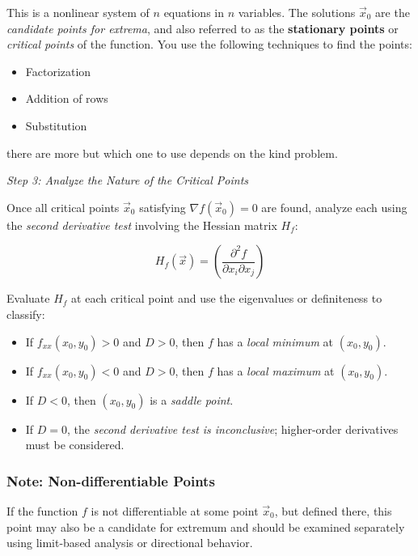 This is a nonlinear system of \( n \) equations in \( n \) variables. The solutions \( \vec{x}_0 \) 
are the \emph{candidate points for extrema}, and also referred to as the 
\textbf{stationary points} or \emph{critical points} of the function.
\newline
You use the following techniques to find the points: 
\begin{itemize}[label=\(-\)]
    \item Factorization
    \item Addition of rows
    \item Substitution
\end{itemize}

there are more but which one to use depends on the kind problem.

\emph{Step 3: Analyze the Nature of the Critical Points}

Once all critical points \( \vec{x}_0 \) satisfying \( \nabla f(\vec{x}_0) = 0 \) are found, analyze each using
 the \emph{second derivative test} involving the Hessian matrix \( H_f \):

\[
H_f(\vec{x}) = \left( \frac{\partial^2 f}{\partial x_i \partial x_j} \right)
\]

Evaluate \( H_f \) at each critical point and use the eigenvalues or definiteness to classify:

\begin{itemize}[label=\(-\)]
    \item If \( f_{xx}(x_0, y_0) > 0 \) and \( D > 0 \), then \( f \) has a \emph{local minimum} at \( (x_0, y_0) \).
    \item If \( f_{xx}(x_0, y_0) < 0 \) and \( D > 0 \), then \( f \) has a \emph{local maximum} at \( (x_0, y_0) \).
    \item If \( D < 0 \), then \( (x_0, y_0) \) is a \emph{saddle point}.
    \item If \( D = 0 \), the \emph{second derivative test is inconclusive}; higher-order derivatives must be considered.
\end{itemize}

\subsubsection{Note: Non-differentiable Points}

If the function \( f \) is not differentiable at some point \( \vec{x}_0 \), but defined there, this point may also be a 
candidate for extremum and should be examined separately using limit-based analysis or directional behavior.

